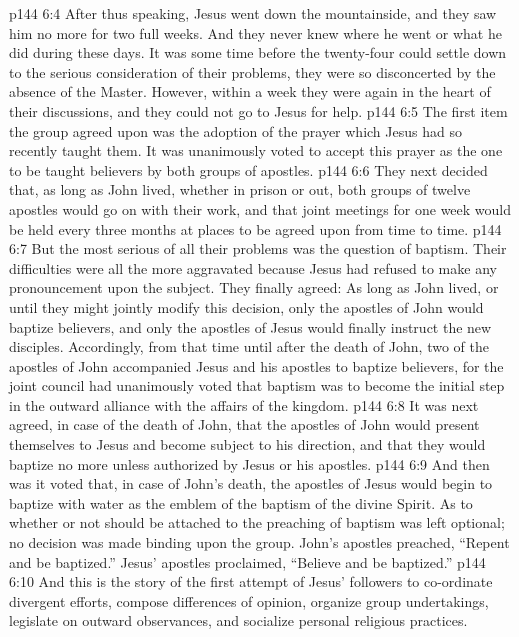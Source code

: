 \vs p144 6:4 After thus speaking, Jesus went down the mountainside, and they saw him no more for two full weeks. And they never knew where he went or what he did during these days. It was some time before the twenty\hyp{}four could settle down to the serious consideration of their problems, they were so disconcerted by the absence of the Master. However, within a week they were again in the heart of their discussions, and they could not go to Jesus for help.
\pc \vs p144 6:5 The first item the group agreed upon was the adoption of the prayer which Jesus had so recently taught them. It was unanimously voted to accept this prayer as the one to be taught believers by both groups of apostles.
\vs p144 6:6 They next decided that, as long as John lived, whether in prison or out, both groups of twelve apostles would go on with their work, and that joint meetings for one week would be held every three months at places to be agreed upon from time to time.
\vs p144 6:7 But the most serious of all their problems was the question of baptism. Their difficulties were all the more aggravated because Jesus had refused to make any pronouncement upon the subject. They finally agreed: As long as John lived, or until they might jointly modify this decision, only the apostles of John would baptize believers, and only the apostles of Jesus would finally instruct the new disciples. Accordingly, from that time until after the death of John, two of the apostles of John accompanied Jesus and his apostles to baptize believers, for the joint council had unanimously voted that baptism was to become the initial step in the outward alliance with the affairs of the kingdom.\plusone
\vs p144 6:8 It was next agreed, in case of the death of John, that the apostles of John would present themselves to Jesus and become subject to his direction, and that they would baptize no more unless authorized by Jesus or his apostles.
\vs p144 6:9 And then was it voted that, in case of John’s death, the apostles of Jesus would begin to baptize with water as the emblem of the baptism of the divine Spirit. As to whether or not  should be attached to the preaching of baptism was left optional; no decision was made binding upon the group. John’s apostles preached, “Repent and be baptized.” Jesus’ apostles proclaimed, “Believe and be baptized.”
\pc \vs p144 6:10 And this is the story of the first attempt of Jesus’ followers to co\hyp{}ordinate divergent efforts, compose differences of opinion, organize group undertakings, legislate on outward observances, and socialize personal religious practices.
